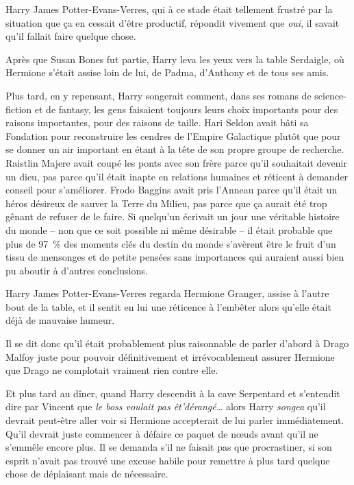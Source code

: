 Harry James Potter-Evans-Verres, qui à ce stade était tellement frustré par la situation que ça en cessait d'être productif, répondit vivement que \emph{oui}, il savait qu'il fallait faire quelque chose.

Après que Susan Bones fut partie, Harry leva les yeux vers la table Serdaigle, où Hermione s'était assise loin de lui, de Padma, d'Anthony et de tous ses amis.

Plus tard, en y repensant, Harry songerait comment, dans ses romans de science-fiction et de fantasy, les gens faisaient toujours leurs choix importants pour des raisons importantes, pour des raisons de taille.
Hari Seldon avait bâti sa Fondation pour reconstruire les cendres de l'Empire Galactique plutôt que pour se donner un air important en étant à la tête de son propre groupe de recherche.
Raistlin Majere avait coupé les ponts avec son frère parce qu'il souhaitait devenir un dieu, pas parce qu'il était inapte en relations humaines et réticent à demander conseil pour s'améliorer.
Frodo Baggins avait pris l'Anneau parce qu'il était un héros désireux de sauver la Terre du Milieu, pas parce que ça aurait été trop gênant de refuser de le faire.
Si quelqu'un écrivait un jour une véritable histoire du monde -- non que ce soit possible ni même désirable -- il était probable que plus de 97~\% des moments clés du destin du monde s'avèrent être le fruit d'un tissu de mensonges et de petite pensées sans importances qui auraient aussi bien pu aboutir à d'autres conclusions.

Harry James Potter-Evans-Verres regarda Hermione Granger, assise à l'autre bout de la table, et il sentit en lui une réticence à l'embêter alors qu'elle était déjà de mauvaise humeur.

Il se dit donc qu'il était probablement plus raisonnable de parler d'abord à Drago Malfoy juste pour pouvoir définitivement et irrévocablement assurer Hermione que Drago ne complotait vraiment rien contre elle.

Et plus tard au dîner, quand Harry descendit à la cave Serpentard et s'entendit dire par Vincent que \emph{le boss voulait pas êt'dérangé…} alors Harry \emph{songea} qu'il devrait peut-être aller voir si Hermione accepterait de lui parler immédiatement.
Qu'il devrait juste commencer à défaire ce paquet de nœuds avant qu'il ne s'emmêle encore plus.
Il se demanda s'il ne faisait pas que procrastiner, si son esprit n'avait pas trouvé une excuse habile pour remettre à plus tard quelque chose de déplaisant mais de nécessaire.

